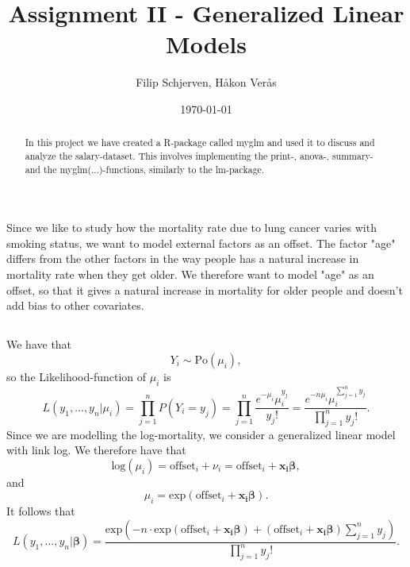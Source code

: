\documentclass{article}
\title{Assignment II - Generalized Linear Models}
\author{Filip Schjerven, Håkon Verås}
\date{\today}
\begin{document}
\maketitle
\begin{abstract}
In this project we have created a R-package called myglm and used it to discuss and analyze the salary-dataset. This involves implementing the print-, anova-, summary- and the myglm(...)-functions, similarly to the lm-package.
\end{abstract}
\newpage

\section{}

\subsection{}
Since we like to study how the mortality rate due to lung cancer varies with smoking status, we want to model external factors as an offset. The factor "age" differs from the other factors in the way people has a natural increase in mortality rate when they get older. We therefore want to model "age" as an offset, so that it gives a natural increase in mortality for older people and doesn't add bias to other covariates.

\subsection{}
We have that
\begin{equation*}
Y_{i} \sim \text{Po}(\mu_{i}),
\end{equation*}
so the Likelihood-function of $\mu_{i}$ is
\begin{equation*}
	L(y_{1},...,y_{n}|\mu_{i}) = \prod_{j=1}^{n} P(Y_{i} = y_{j}) = \prod_{j=1}^{n} \frac{e^{-\mu_{i}}\mu_{i}^{y_{j}}}{y_{j}!} = \frac{e^{-n\mu_{i}} \mu_{i}^{\sum_{j=1}^{n} y_{j}} }{\prod_{j=1}^{n} y_{j}!}.
\end{equation*}
Since we are modelling the log-mortality, we consider a generalized linear model with link log. We therefore have that
\begin{equation*}
\text{log}(\mu_{i}) = \text{offset}_{i} + \nu_{i} = \text{offset}_{i} + \boldsymbol{x_{i} \beta},
\end{equation*}
and
\begin{equation*}
\mu_{i} = \text{exp}(\text{offset}_{i} + \boldsymbol{x_{i} \beta}).
\end{equation*}
It follows that
\begin{equation*}
L(y_{1},...,y_{n}|\boldsymbol{\beta}) = \frac{\text{exp}\left(-n \cdot \text{exp}(\text{offset}_{i} + \boldsymbol{x_{i}\beta}) + \left(\text{offset}_{i} + \boldsymbol{x_{i}\beta}\right) \sum_{j=1}^{n}y_{j} \right)}{\prod_{j=1}^{n} y_{j}!}.
\end{equation*}
\end{document}

